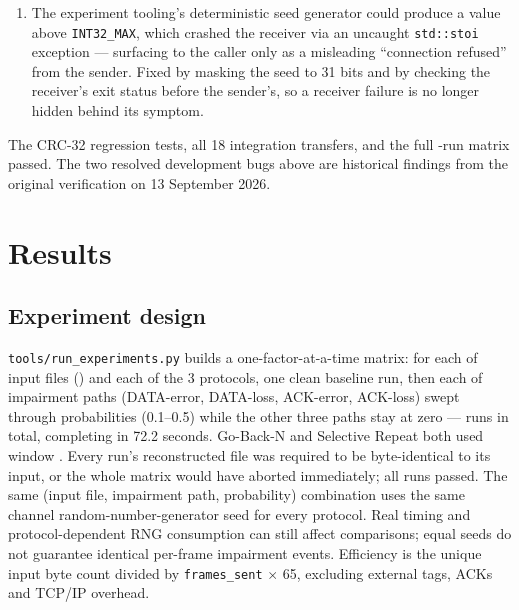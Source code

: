 \documentclass[11pt]{article}
\begin{document}
\begin{itemize}[nosep]
\begin{enumerate}[nosep]
                    fail. Root-caused and fixed by draining any non-completion message while waiting for the
                    completion signal, in all three protocols.
              \item The experiment tooling's deterministic seed generator could produce a value above
                    \texttt{INT32\_MAX}, which crashed the receiver via an uncaught \texttt{std::stoi} exception
                    --- surfacing to the caller only as a misleading ``connection refused'' from the sender. Fixed
                    by masking the seed to 31 bits and by checking the receiver's exit status before the
                    sender's, so a receiver failure is no longer hidden behind its symptom.
          \end{enumerate}
\end{itemize}

The CRC-32 regression tests, all 18 integration transfers, and the full \NumRuns{}-run matrix
passed. The two resolved development bugs above are historical findings
from the original verification on 13 September 2026.

\section{Results}

\subsection{Experiment design}
\texttt{tools/run\_experiments.py} builds a one-factor-at-a-time matrix: for each of \NumInputs{}
input files (\InputSizeList{}) and each of the 3 protocols, one clean baseline run, then each of
\NumPaths{} impairment paths (DATA-error, DATA-loss, ACK-error, ACK-loss) swept through
\NumProbabilities{} probabilities (0.1--0.5) while the other three paths stay at zero --- \NumRuns{}
runs in total, completing in 72.2 seconds. Go-Back-N and Selective Repeat both used window
\WindowSize{}. Every run's reconstructed file was required to be byte-identical to its input, or the
whole matrix would have aborted immediately; all \NumRuns{} runs passed. The same (input file,
impairment path, probability) combination uses the same channel random-number-generator seed
for every protocol. Real timing and protocol-dependent RNG consumption can still affect comparisons;
equal seeds do not guarantee identical per-frame impairment events. Efficiency is the unique input
byte count divided by \texttt{frames\_sent} $\times$ 65, excluding external tags, ACKs and TCP/IP overhead.
\end{document}
